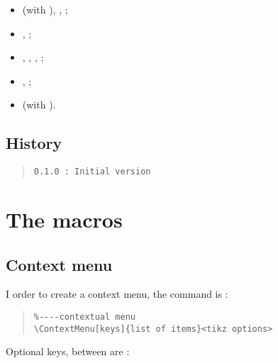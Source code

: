\documentclass[11pt,a4paper]{ltxdoc}
\begin{document}
\begin{itemize}
	\item {} (with ), ,  ;
	\item {},  ;
	\item {}, , ,  ;
	\item {},  ;
	\item {} (with ).
\end{itemize}

\vfill

\subsection{History}

\begin{quote}
\begin{verbatim}
0.1.0 : Initial version
\end{verbatim}
\end{quote}

\pagebreak

\section{The macros}

\subsection{Context menu}

I order to create a context menu, the command is :

\begin{quote}
\begin{verbatim}
%----contextual menu
\ContextMenu[keys]{list of items}<tikz options>
\end{verbatim}
\end{quote}

Optional keys, between \MontreCode{[...]} are :
\end{document}
